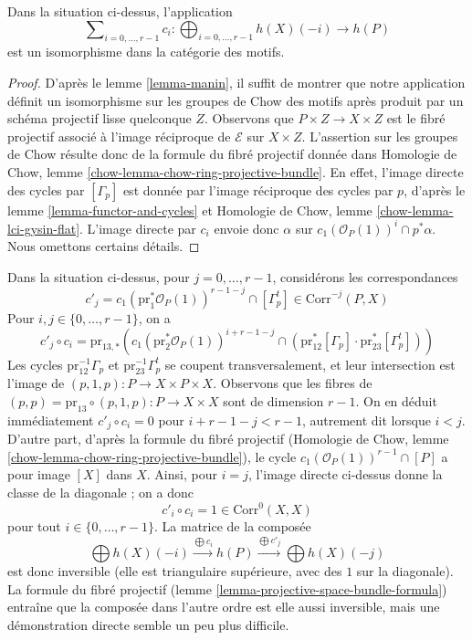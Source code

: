 \begin{lemma}
\label{lemma-projective-space-bundle-formula}
Dans la situation ci-dessus, l'application
$$
\sum\nolimits_{i = 0, \ldots, r - 1} c_i :
\bigoplus\nolimits_{i = 0, \ldots, r - 1} h(X)(-i)
\longrightarrow
h(P)
$$
est un isomorphisme dans la catégorie des motifs.
\end{lemma}

\begin{proof}
D'après le lemme \ref{lemma-manin}, il suffit de montrer que
notre application définit un isomorphisme sur les groupes de Chow des motifs
après produit par un schéma projectif lisse quelconque $Z$.
Observons que $P \times Z \to X \times Z$ est le fibré
projectif associé à l'image réciproque de $\mathcal{E}$ sur $X \times Z$.
L'assertion sur les groupes de Chow résulte donc de la formule
du fibré projectif donnée dans
Homologie de Chow, lemme \ref{chow-lemma-chow-ring-projective-bundle}.
En effet, l'image directe des cycles par $[\Gamma_p]$ est donnée par l'image réciproque
des cycles par $p$, d'après le lemme \ref{lemma-functor-and-cycles} et
Homologie de Chow, lemme \ref{chow-lemma-lci-gysin-flat}. L'image directe
par $c_i$ envoie donc $\alpha$ sur $c_1(\mathcal{O}_P(1))^i \cap p^*\alpha$.
Nous omettons certains détails.
\end{proof}

\noindent
Dans la situation ci-dessus, pour $j = 0, \ldots, r - 1$, considérons
les correspondances
$$
c'_j = c_1(\text{pr}_1^*\mathcal{O}_P(1))^{r - 1 - j} \cap [\Gamma_p^t] \in
\text{Corr}^{-j}(P, X)
$$
Pour $i, j \in \{0, \ldots, r - 1\}$, on a
$$
c'_j \circ c_i =
\text{pr}_{13, *}\left(
c_1(\text{pr}_2^*\mathcal{O}_P(1))^{i + r - 1 - j} \cap
(\text{pr}_{12}^*[\Gamma_p] \cdot \text{pr}_{23}^*[\Gamma_p^t])
\right)
$$
Les cycles $\text{pr}_{12}^{-1}\Gamma_p$ et
$\text{pr}_{23}^{-1}\Gamma_p^t$ se coupent transversalement,
et leur intersection est l'image de
$(p, 1, p) : P \to X \times P \times X$.
Observons que les fibres de
$(p, p) = \text{pr}_{13} \circ (p, 1, p) : P \to X \times X$
sont de dimension $r - 1$. On en déduit immédiatement
$c'_j \circ c_i = 0$ pour $i + r - 1 - j < r - 1$, autrement dit lorsque $i < j$.
D'autre part, d'après la formule du fibré projectif
(Homologie de Chow, lemme \ref{chow-lemma-chow-ring-projective-bundle}),
le cycle $c_1(\mathcal{O}_P(1))^{r - 1} \cap [P]$ a pour image
$[X]$ dans $X$. Ainsi, pour $i = j$, l'image directe ci-dessus
donne la classe de la diagonale ; on a donc
$$
c'_i \circ c_i = 1 \in \text{Corr}^0(X, X)
$$
pour tout $i \in \{0, \ldots, r - 1\}$. La matrice
de la composée
$$
\bigoplus h(X)(-i)
\xrightarrow{\bigoplus c_i}
h(P)
\xrightarrow{\bigoplus c'_j}
\bigoplus h(X)(-j)
$$
est donc inversible (elle est triangulaire supérieure, avec des $1$ sur la diagonale).
La formule du fibré projectif
(lemme \ref{lemma-projective-space-bundle-formula})
entraîne que la composée dans l'autre ordre est elle aussi
inversible, mais une démonstration directe semble un peu plus difficile.

